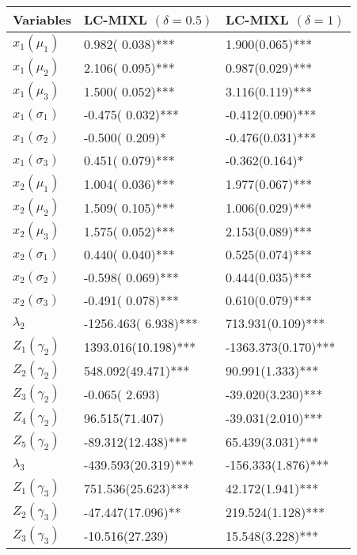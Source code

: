 \begin{tabular}{lll}
  \hline
Variables & LC-MIXL $(\delta=0.5)$ & LC-MIXL $(\delta=1)$ \\ 
  \hline
$x_{1} (\mu_{1})$ &     0.982( 0.038)*** &     1.900(0.065)*** \\ 
  $x_{1} (\mu_{2})$ &     2.106( 0.095)*** &     0.987(0.029)*** \\ 
  $x_{1} (\mu_{3})$ &     1.500( 0.052)*** &     3.116(0.119)*** \\ 
  $x_{1} (\sigma_{1}) $ &    -0.475( 0.032)*** &    -0.412(0.090)*** \\ 
  $x_{1} (\sigma_{2}) $ &    -0.500( 0.209)*   &    -0.476(0.031)*** \\ 
  $x_{1} (\sigma_{3}) $ &     0.451( 0.079)*** &    -0.362(0.164)*   \\ 
  $x_{2} (\mu_{1}) $ &     1.004( 0.036)*** &     1.977(0.067)*** \\ 
  $x_{2} (\mu_{2}) $ &     1.509( 0.105)*** &     1.006(0.029)*** \\ 
  $x_{2} (\mu_{3}) $ &     1.575( 0.052)*** &     2.153(0.089)*** \\ 
  $x_{2} (\sigma_{1}) $ &     0.440( 0.040)*** &     0.525(0.074)*** \\ 
  $x_{2} (\sigma_{2}) $ &    -0.598( 0.069)*** &     0.444(0.035)*** \\ 
  $x_{2} (\sigma_{3}) $ &    -0.491( 0.078)*** &     0.610(0.079)*** \\ 
  $\lambda_{2}$ & -1256.463( 6.938)*** &   713.931(0.109)*** \\ 
  $Z_1 (\gamma_{2})$ &  1393.016(10.198)*** & -1363.373(0.170)*** \\ 
  $Z_2 (\gamma_{2})$ &   548.092(49.471)*** &    90.991(1.333)*** \\ 
  $Z_3 (\gamma_{2})$ &    -0.065( 2.693)    &   -39.020(3.230)*** \\ 
  $Z_4 (\gamma_{2})$ &    96.515(71.407)    &   -39.031(2.010)*** \\ 
  $Z_5 (\gamma_{2})$ &   -89.312(12.438)*** &    65.439(3.031)*** \\ 
  $\lambda_{3}$ &  -439.593(20.319)*** &  -156.333(1.876)*** \\ 
  $Z_1 (\gamma_{3})$ &   751.536(25.623)*** &    42.172(1.941)*** \\ 
  $Z_2 (\gamma_{3})$ &   -47.447(17.096)**  &   219.524(1.128)*** \\ 
  $Z_3 (\gamma_{3})$ &   -10.516(27.239)    &    15.548(3.228)*** \\ 

\end{tabular}
